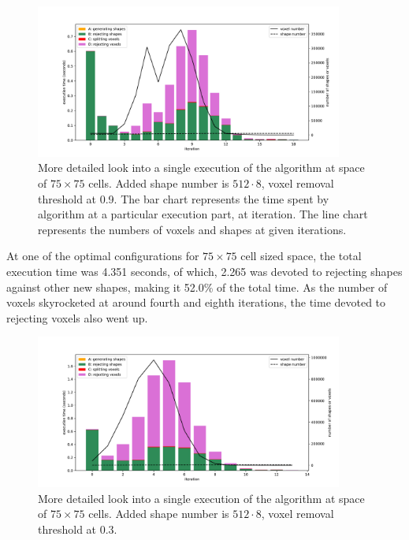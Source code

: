 \documentclass[12pt, oneside]{report}
\begin{document}
\begin{figure}[H]
  \centering
	\includegraphics[width=0.9\textwidth,keepaspectratio]{Images/SummaryOptimisation/iter_75_512x8_09_v2.pdf}
	\caption{More detailed look into a single execution of the algorithm at space of $75 \times 75$ cells. Added shape number is $512 \cdot 8$, voxel removal threshold at 0.9. The bar chart represents the time spent by algorithm at a particular execution part, at iteration. The line chart represents the numbers of voxels and shapes at given iterations.}
	\label{summary_detail_75_512x8_09}
\end{figure}

At one of the optimal configurations for $75 \times 75$ cell sized space, the total execution time was 4.351 seconds, of which, 2.265 was devoted to rejecting shapes against other new shapes, making it 52.0\% of the total time. As the number of voxels skyrocketed at around fourth and eighth iterations, the time devoted to rejecting voxels also went up.

\begin{figure}[H]
  \centering
	\includegraphics[width=0.9\textwidth,keepaspectratio]{Images/SummaryOptimisation/iter_75_512x8_03_v2.pdf}
	\caption{More detailed look into a single execution of the algorithm at space of $75 \times 75$ cells. Added shape number is $512 \cdot 8$, voxel removal threshold at 0.3.}
	\label{summary_detail_75_512x8_03}
\end{figure}
\end{document}
